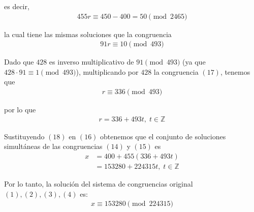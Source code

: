 \documentclass[letterpaper,11pt]{article}
\begin{document}
\begin{enumerate}
\begin{itemize}
        es decir,
        \begin{align*}
            455r \equiv 450-400 = 50 \pmod{2465}
        \end{align*}
        
        la cual tiene las mismas soluciones que la congruencia 
        \begin{align}
            91r \equiv 10 \pmod{493}
        \end{align}
        
        Dado que $428$ es inverso multiplicativo de $91 \pmod{493}$ (ya que
        $428 \cdot 91 \equiv 1 \pmod{493}$), multiplicando por $428$ la 
        congruencia $(17)$, tenemos que 
        \begin{align*}
            r \equiv 336 \pmod{493}
        \end{align*}
        
        por lo que 
        \begin{align}
            r = 336 + 493t, \; t \in \mathbb{Z}
        \end{align}
        
        Sustituyendo $(18)$ en $(16)$ obtenemos que el conjunto de soluciones
        simultáneas de las congruencias $(14)$ y $(15)$ es
        \begin{align*}
            x 
            &= 400 + 455(336 + 493t) \\
            &= 153280 + 224315t, \; t \in \mathbb{Z}
        \end{align*}
        
        Por lo tanto, la solución del sistema de congruencias original 
        $(1), (2), (3), (4)$ es:
        \begin{align*}
            x \equiv 153280 \pmod{224315}
        \end{align*}
    \end{itemize}
    

\end{enumerate}
\end{document}
